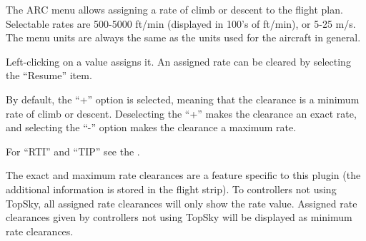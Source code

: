 \documentclass[11pt,a4paper,oldfontcommands]{memoir}
\newenvironment{Warn}
  {\begin{shaded}\marginnote{\fbox{Warning}}}
  {\end{shaded}}
\begin{document}
The ARC menu allows assigning a rate of climb or descent to the flight plan. Selectable
rates are 500-5000 ft/min (displayed in 100’s of ft/min), or 5-25 m/s. The menu units are
always the same as the units used for the aircraft in general.

Left-clicking on a value assigns it. An assigned rate can be cleared by selecting the
“Resume” item.

By default, the “+” option is selected, meaning that the clearance is a minimum rate of
climb or descent. Deselecting the “+” makes the clearance an exact rate, and selecting
the “-” option makes the clearance a maximum rate.

For “RTI” and “TIP” see the \textit{}.

\begin{Warn}
The exact and maximum rate clearances are a feature specific to this plugin (the additional information is stored in the flight strip). To controllers not using TopSky, all assigned rate clearances will only show the rate value.
Assigned rate clearances given by controllers not using TopSky will be displayed as minimum rate clearances.      
\end{Warn}
\end{document}
